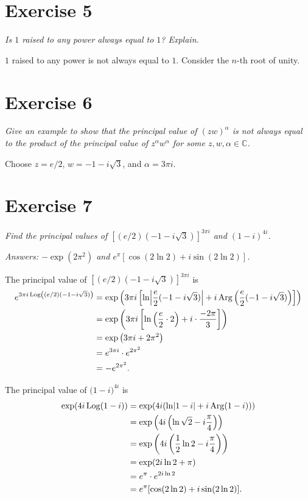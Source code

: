 \documentclass{tufte-handout}
\DeclareMathOperator{\Log}{Log}
\DeclareMathOperator{\Arg}{Arg}
\DeclarePairedDelimiter\abs{\lvert}{\rvert}%
\begin{document}
\section{Exercise 5}

\emph{Is $1$ raised to any power always equal to $1$? Explain.}

\bigskip

$1$ raised to any power is not always equal to $1$. Consider the
$n$-th root of unity.

\section{Exercise 6}

\emph{Give an example to show that the principal value of
  ${(z w)}^\alpha$ is not always equal to the product of the principal
  value of $z^\alpha w^\alpha$ for some $z,w,\alpha \in \mathbb{C}$.}

\bigskip

Choose $z = e/2$, $w = -1 - i \sqrt 3$, and $\alpha = 3 \pi i$.

\section{Exercise 7}

\emph{Find the principal values of ${[(e/2)(-1 - i \sqrt 3)]}^{3 \pi
    i}$ and ${(1 - i)}^{4i}$.}

\emph{\emph{Answers:} $-\exp(2 \pi^2)$ and $e^\pi [\cos(2 \ln 2) + i
  \sin (2 \ln 2)]$.}

\bigskip

The principal value of ${[(e/2)(-1 - i \sqrt 3)]}^{3 \pi i}$ is
\begin{align*}
  e^{3 \pi i \Log\left( (e/2) (-1 - i \sqrt 3) \right)}
  &= \exp\left( 3 \pi i \left[ \ln\abs*{{e \over 2}(-1 - i \sqrt 3)} +
    i \Arg\left({e \over 2}(-1 - i \sqrt 3) \right) \right] \right) \\
  &= \exp\left(3 \pi i \left[ \ln \left( {e \over 2} \cdot 2 \right) +
    i \cdot {-2 \pi \over 3} \right] \right)\\
  &= \exp\left(3 \pi i + 2 \pi^2 \right)\\
  &= e^{3 \pi i} \cdot e^{2 \pi^2}\\
  &= -e^{2 \pi^2}.
\end{align*}

The principal value of $(1 - i{)}^{4i}$ is
\begin{align*}
  \exp( 4i \Log(1 - i))
  &= \exp( 4i (\ln \abs{1 - i} + i \Arg(1 - i)))\\
  &= \exp\left( 4 i \left(\ln \sqrt 2 - i {\pi \over 4} \right)
    \right)\\
  &= \exp \left( 4 i \left( {1 \over 2} \ln 2 - i {\pi \over 4}
    \right) \right)\\
  &= \exp( 2 i \ln 2 + \pi)\\
  &= e^\pi \cdot e^{2i \ln 2}\\
  &= e^\pi [ \cos(2 \ln 2) + i \sin(2 \ln 2)].
\end{align*}
\end{document}
